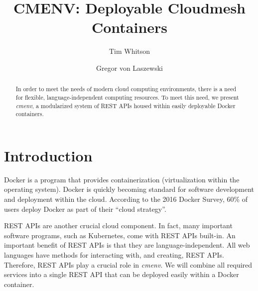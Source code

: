 
\title{CMENV: Deployable Cloudmesh Containers}

\author{Tim Whitson}

\author{Gregor von Laszewski}

\renewcommand{\shortauthors}{T. Whitson}

\def \projectname {\textit{cmenv}}

\begin{abstract}
In order to meet the needs of modern cloud computing environments, there is a
need for flexible, language-independent computing resources. To meet this
need, we present \projectname, a modularized system of REST APIs housed
within easily deployable Docker containers.
\end{abstract}


\maketitle

\section{Introduction}

Docker is a program that provides containerization (virtualization
within the operating system). Docker is quickly becoming standard for
software development and deployment within the cloud. According to the
2016 Docker Survey, 60\% of users deploy Docker as part of their ``cloud
strategy''\cite{hid-sp18-526-docker-survey}.

REST APIs are another crucial cloud component. In fact, many important software
programs, such as Kubernetes, come with REST APIs built-in. An important
benefit of REST APIs is that they are language-independent. All web languages
have methods for interacting with, and creating, REST APIs. Therefore, REST
APIs play a crucial role in \projectname. We will combine all required services
into a single REST API that can be deployed easily within a Docker container.

